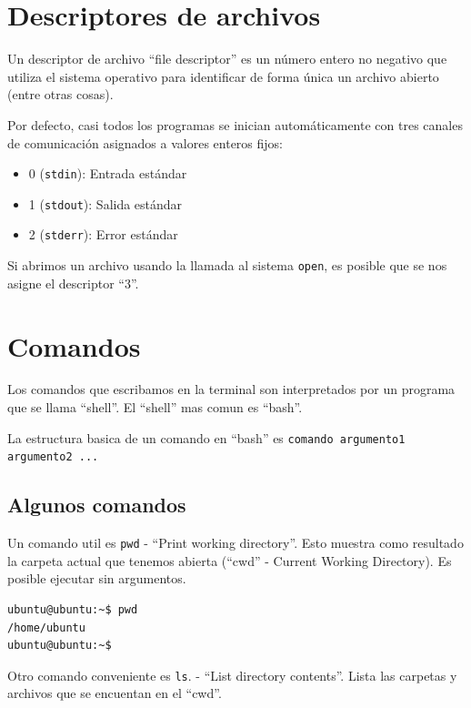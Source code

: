 \documentclass[11pt,a4paper]{article}
\begin{document}
\section{Descriptores de archivos}

Un descriptor de archivo ``file descriptor'' es un número entero no negativo que utiliza el sistema operativo para identificar de forma única un archivo abierto (entre otras cosas).

Por defecto, casi todos los programas se inician automáticamente con tres canales de comunicación asignados a valores enteros fijos:

\begin{itemize}[nosep]
  \item 0 (\texttt{stdin}): Entrada estándar
  \item 1 (\texttt{stdout}): Salida estándar
  \item 2 (\texttt{stderr}): Error estándar
\end{itemize}

Si abrimos un archivo usando la llamada al sistema \lstinline!open!, es posible que se nos asigne el descriptor ``3''.

\section{Comandos}

Los comandos que escribamos en la terminal son interpretados por un programa que se llama ``shell''. El ``shell'' mas comun es ``bash''.

La estructura basica de un comando en ``bash'' es \lstinline!comando argumento1 argumento2 ...!

\subsection{Algunos comandos}

Un comando util es \lstinline!pwd! - ``Print working directory''. Esto muestra como resultado la carpeta actual que tenemos abierta (``cwd'' - Current Working Directory). Es posible ejecutar sin argumentos.

\begin{lstlisting}[language=bash]
ubuntu@ubuntu:~$ pwd
/home/ubuntu
ubuntu@ubuntu:~$
\end{lstlisting}

Otro comando conveniente es \lstinline!ls!. - ``List directory contents''. Lista las carpetas y archivos que se encuentan en el ``cwd''.
\end{document}
